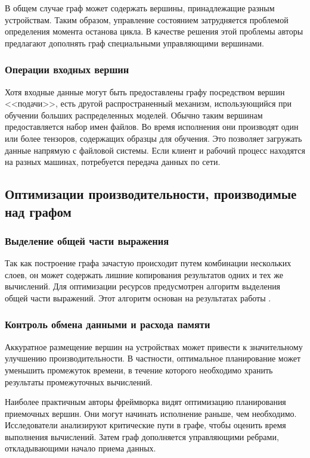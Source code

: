 В общем случае граф может содержать вершины, принадлежащие разным устройствам.
Таким образом, управление состоянием затрудняется проблемой определения момента
останова цикла. В качестве решения этой проблемы авторы предлагают дополнять
граф специальными управляющими вершинами.

\subsubsection{Операции входных вершин}

Хотя входные данные могут быть предоставлены графу посредством вершин <<подачи>>,
есть другой распространенный механизм, использующийся при обучении больших
распределенных моделей. Обычно таким вершинам предоставляется набор имен файлов.
Во время исполнения они производят один или более тензоров, содержащих образцы
для обучения. Это позволяет загружать данные напрямую с файловой системы. Если
клиент и рабочий процесс находятся на разных машинах, потребуется передача
данных по сети.

\subsection{Оптимизации производительности, производимые над графом}

\subsubsection{Выделение общей части выражения}
Так как построение графа зачастую происходит путем комбинации нескольких слоев,
он может содержать лишние копирования результатов одних и тех же вычислений.
Для оптимизации ресурсов предусмотрен алгоритм выделения общей части выражений.
Этот алгоритм основан на результатах работы \cite{click}.

\subsubsection{Контроль обмена данными и расхода памяти}

Аккуратное размещение вершин на устройствах может привести к значительному
улучшению производительности. В частности, оптимальное планирование может
уменьшить промежуток времени, в течение которого необходимо хранить результаты
промежуточных вычислений.

Наиболее практичным авторы фреймворка видят оптимизацию планирования приемочных
вершин. Они могут начинать исполнение раньше, чем необходимо. Исследователи
анализируют критические пути в графе, чтобы оценить время выполнения вычислений.
Затем граф дополняется управляющими ребрами, откладывающими начало приема данных.

